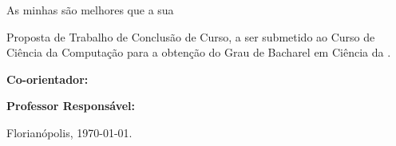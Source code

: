 


\begin{titlepage}

    \center




    \Author



    \bigskip
    As minhas são melhores que a sua\\[3cm]

    \begin{flushright}

        \begin{minipage}{0.518\textwidth}

            Proposta de Trabalho de Conclusão de Curso,
            a ser submetido ao Curso de Ciência da Computação
            para a obtenção do Grau de Bacharel em Ciência da .

            \medskip
            {\bfseries Co-orientador:} \hfill \Advisor

            \medskip
            {\bfseries Professor Responsável:} \hfill \Supervisor

        \end{minipage}

    \end{flushright}


    Florianópolis, \today.

\end{titlepage}






